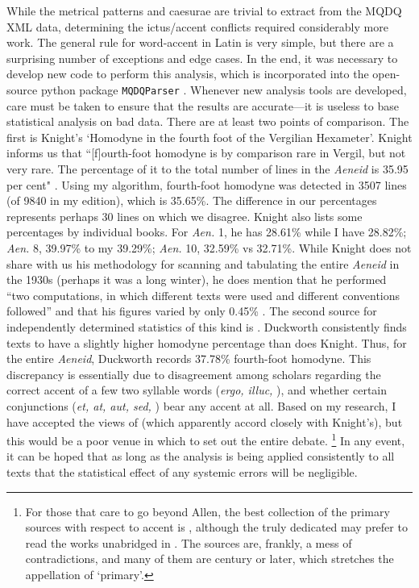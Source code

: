 \documentclass[11pt,a4paper]{scrartcl} %
\begin{document}
{While the metrical patterns and caesurae are trivial to extract from the MQDQ XML data, determining the ictus/accent conflicts required considerably more work. The general rule for word-accent in Latin is very simple, but there are a surprising number of exceptions and edge cases. In the end, it was necessary to develop new code to perform this analysis, which is incorporated into the open-source python package \texttt{MQDQParser} \cite{nagy_mqdq_2019}. Whenever new analysis tools are developed, care must be taken to ensure that the results are accurate---it is useless to base statistical analysis on bad data. There are at least two points of comparison. The first is Knight's `Homodyne in the fourth foot of the Vergilian Hexameter'. Knight informs us that ``[f]ourth-foot homodyne is by comparison rare in Vergil, but not very rare. The percentage of it to the total number of lines in the \textit{Aeneid} is 35.95 per cent" \cite[186]{knight_homodyne_1931}. Using my algorithm, fourth-foot homodyne was detected in 3507 lines (of 9840 in my edition), which is 35.65\%. The difference in our percentages represents perhaps 30 lines on which we disagree. Knight also lists some percentages by individual books. For \textit{Aen.} 1, he has 28.61\% while I have 28.82\%; \textit{Aen.} 8, 39.97\% to my 39.29\%; \textit{Aen.} 10, 32.59\% vs 32.71\%. While Knight does not share with us his methodology for scanning and tabulating the entire \textit{Aeneid} in the 1930s (perhaps it was a long winter), he does mention that he performed ``two computations, in which different texts were used and different conventions followed'' and that his figures varied by only 0.45\% \cite[186 n. 1]{knight_homodyne_1931}. The second source for independently determined statistics of this kind is . Duckworth consistently finds texts to have a slightly higher homodyne percentage than does Knight. Thus, for the entire \textit{Aeneid}, Duckworth records 37.78\% fourth-foot homodyne. This discrepancy is essentially due to disagreement among scholars regarding the correct accent of a few two syllable words (\textit{ergo, illuc,} \textellipsis), and whether certain conjunctions (\textit{et, at, aut, sed,} \textellipsis) bear any accent at all. Based on my research,
I have accepted the views of  (which apparently accord closely with Knight's), but this would be a poor venue in which to set out the entire debate.%
\footnote{For those that care to go beyond Allen, the best collection of the primary sources with respect to accent is , although the truly dedicated may prefer to read the works unabridged in . The sources are, frankly, a mess of contradictions, and many of them are  century or later, which stretches the appellation of `primary'.}
In any event, it can be hoped that as long as the analysis is being applied consistently to all texts that the statistical effect of any systemic errors will be negligible.

}
\end{document}
